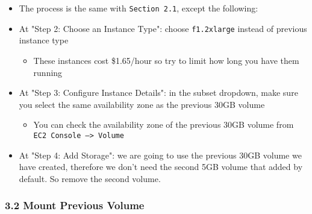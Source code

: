 \documentclass[]{article}
\begin{document}
\begin{itemize}
\item
  The process is the same with \texttt{Section\ 2.1}, except the
  following:
\item
  At "Step 2: Choose an Instance Type": choose \texttt{f1.2xlarge}
  instead of previous instance type

  \begin{itemize}
  \item
    These instances cost \$1.65/hour so try to limit how long you have
    them running
  \end{itemize}
\item
  At "Step 3: Configure Instance Details": in the subset dropdown, make
  sure you select the same availability zone as the previous 30GB volume

  \begin{itemize}
  \item
    You can check the availability zone of the previous 30GB volume from
    \texttt{EC2\ Console\ —\textgreater{}\ Volume}
  \end{itemize}
\item
  At "Step 4: Add Storage": we are going to use the previous 30GB volume
  we have created, therefore we don't need the second 5GB volume that
  added by default. So remove the second volume.
\end{itemize}

\hypertarget{header-n443}{%
\subsubsection{3.2 Mount Previous Volume}\label{header-n443}}
\end{document}
